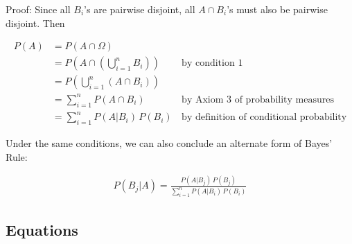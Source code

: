 \documentclass[a4paper,10pt]{article}
\begin{document}
Proof: Since all $B_i$'s are pairwise disjoint, all $A\cap B_i$'s must also be pairwise disjoint. Then 

\begin{align*}
    P(A) &= P(A\cap \Omega) \\
         &= P\left(A\cap \left(\bigcup_{i=1}^n B_i\right)\right)\,&\text{by condition 1}\\
         &= P\left(\bigcup_{i=1}^n \left(A\cap B_i\right)\right) \\
         &= \sum_{i=1}^n P(A\cap B_i)\,&\text{by Axiom 3 of probability measures}\\
         &= \sum_{i=1}^n P(A|B_i)\,P(B_i)\,&\text{by definition of conditional probability}
\end{align*}

Under the same conditions, we can also conclude an alternate form of Bayes' Rule:

\begin{align*}
    P(B_j|A) = \frac{P(A|B_j)\,P(B_j)}{\sum_{i=1}^n P(A|B_i)\,P(B_i)}
\end{align*}

\subsection{Equations}
\end{document}
